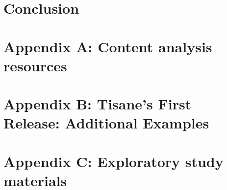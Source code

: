 \documentclass[11pt]{book}
\begin{document}
\chapter{Conclusion}
\label{chapter:conclusion}


\clearpage
{}
\singlespacing



\newpage
\newcommand{\beginsupplement}{%
    \setcounter{chapter}{0}
    \renewcommand{\thechapter}{\Alph{chapter}}%
 }

\beginsupplement
\chapter{Appendix A: Content analysis resources}
\label{chapter:appHypoForm}


\chapter{Appendix B: Tisane's First Release: Additional Examples}
\label{chapter:appTisane}


\chapter{Appendix C: Exploratory study materials}
\label{chapter:rTisane} \label{appendix:summativeEvaluation} 

\end{document}
